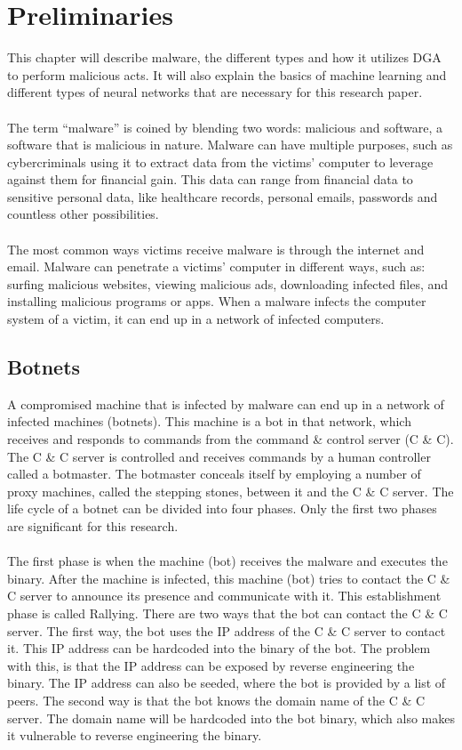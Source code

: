 \chapter{Preliminaries}\label{preliminaries}
This chapter will describe malware, the different types and how it utilizes DGA to perform malicious acts. It will also explain the basics of machine learning and different types of neural networks that are necessary for this research paper.\\\\ 
The term “malware” is coined by blending two words: malicious and software, a software that is malicious in nature. Malware can have multiple purposes, such as cybercriminals using it to extract data from the victims' computer to leverage against them for financial gain. This data can range from financial data to sensitive personal data, like healthcare records, personal emails, passwords and countless other possibilities.\\\\
The most common ways victims receive malware is through the internet and email.  Malware can penetrate a victims' computer in different ways, such as: surfing malicious websites, viewing malicious ads, downloading infected files, and installing malicious programs or apps. When a malware infects the computer system of a victim, it can end up in a network of infected computers.

\section{Botnets}
A compromised machine that is infected by malware can end up in a network of infected machines (botnets). This machine is a bot in that network, which receives and responds to commands from the command \& control server (C \& C). The C \& C server is controlled and receives commands by a human controller called a botmaster. The botmaster conceals itself by employing a number of proxy machines, called the stepping stones, between it and the C \& C server. The life cycle of a botnet can be divided into four phases. Only the first two phases are significant for this research.\\\\
The first phase is when the machine (bot) receives the malware and executes the binary. After the machine is infected, this machine (bot) tries to contact the C \& C server to announce its presence and communicate with it. This establishment phase is called Rallying. There are two ways that the bot can contact the C \& C server. The first way, the bot uses the IP address of the C \& C server to contact it. This IP address can be hardcoded into the binary of the bot. The problem with this, is that the IP address can be exposed by reverse engineering the binary. The IP address can also be seeded, where the bot is provided by a list of peers. The second way is that the bot knows the domain name of the C \& C server. The domain name will be hardcoded into the bot binary, which also makes it vulnerable to reverse engineering the binary.

